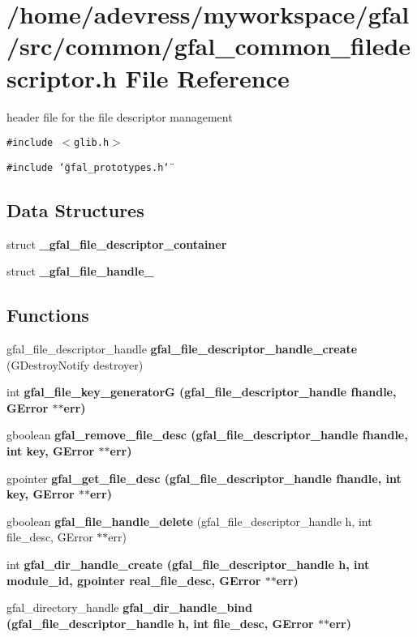 \section{/home/adevress/myworkspace/gfal/src/common/gfal\_\-common\_\-filedescriptor.h File Reference}
\label{gfal__common__filedescriptor_8h}
header file for the file descriptor management 

{\tt \#include $<$glib.h$>$}\par
{\tt \#include \char`\"{}gfal\_\-prototypes.h\char`\"{}}\par
\subsection*{Data Structures}
\begin{CompactItemize}
\item 
struct \textbf{\_\-gfal\_\-file\_\-descriptor\_\-container}
\item 
struct \textbf{\_\-gfal\_\-file\_\-handle\_\-}
\end{CompactItemize}
\subsection*{Functions}
\begin{CompactItemize}
\item 
gfal\_\-file\_\-descriptor\_\-handle \textbf{gfal\_\-file\_\-descriptor\_\-handle\_\-create} (GDestroy\-Notify destroyer)\label{gfal__common__filedescriptor_8h_9c7178945c6bcbebf9fa7b082c964480}

\item 
int \bf{gfal\_\-file\_\-key\_\-generator\-G} (gfal\_\-file\_\-descriptor\_\-handle fhandle, GError $\ast$$\ast$err)
\item 
gboolean \bf{gfal\_\-remove\_\-file\_\-desc} (gfal\_\-file\_\-descriptor\_\-handle fhandle, int key, GError $\ast$$\ast$err)
\item 
gpointer \bf{gfal\_\-get\_\-file\_\-desc} (gfal\_\-file\_\-descriptor\_\-handle fhandle, int key, GError $\ast$$\ast$err)
\item 
gboolean \textbf{gfal\_\-file\_\-handle\_\-delete} (gfal\_\-file\_\-descriptor\_\-handle h, int file\_\-desc, GError $\ast$$\ast$err)\label{gfal__common__filedescriptor_8h_93c7b3ac8466749da63df8d4c9f2642d}

\item 
int \bf{gfal\_\-dir\_\-handle\_\-create} (gfal\_\-file\_\-descriptor\_\-handle h, int module\_\-id, gpointer real\_\-file\_\-desc, GError $\ast$$\ast$err)
\item 
gfal\_\-directory\_\-handle \bf{gfal\_\-dir\_\-handle\_\-bind} (gfal\_\-file\_\-descriptor\_\-handle h, int file\_\-desc, GError $\ast$$\ast$err)
\end{CompactItemize}


